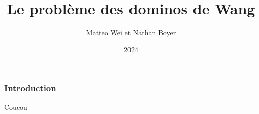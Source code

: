 \documentclass{beamer}
\title{Le problème des dominos de Wang}
\author{Matteo Wei et Nathan Boyer}
\date{2024}
\begin{document}
\frame{\titlepage}

\begin{frame}
\frametitle{Introduction}
Coucou
\end{frame}
\end{document}
